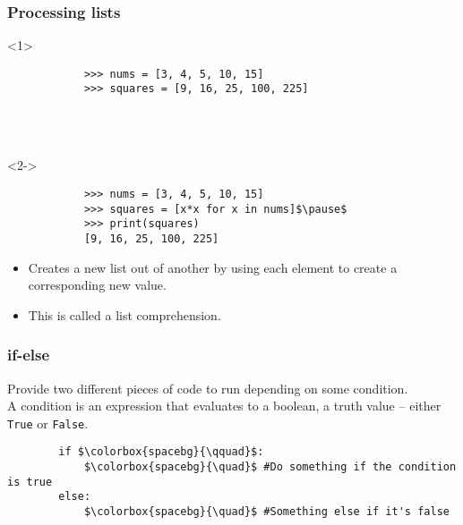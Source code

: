 \documentclass[presentation]{beamer}
\begin{document}
	\begin{frame}[fragile]
		\frametitle{Processing lists}
		
		\begin{onlyenv}<1>
			\begin{lstlisting}
			>>> nums = [3, 4, 5, 10, 15]
			>>> squares = [9, 16, 25, 100, 225]
			\end{lstlisting}
			
			~ \\
			~ \\
			
		\end{onlyenv}
		
		\pause
		
		\begin{onlyenv}<2->
			\begin{lstlisting}
			>>> nums = [3, 4, 5, 10, 15]
			>>> squares = [x*x for x in nums]$\pause$
			>>> print(squares)
			[9, 16, 25, 100, 225]
			\end{lstlisting}
		\end{onlyenv}
		
		\pause
		
		\begin{itemize}
			\item Creates a new list out of another by using each element to create a corresponding new value.
			\item This is called a \colorbox{jargonbg}{list comprehension}.
		\end{itemize}
	\end{frame}
	
	
	\begin{frame}[fragile]
		\frametitle{if-else}
		
		Provide two different pieces of code to run depending on some condition.\\
		\pause
		A condition is an expression that evaluates to a boolean, a truth value -- either \colorbox{codebg}{\lstinline|True|} or \colorbox{codebg}{\lstinline|False|}.
		
		\pause
		\begin{lstlisting}
		if $\colorbox{spacebg}{\qquad}$:
		    $\colorbox{spacebg}{\quad}$ #Do something if the condition is true
		else:
		    $\colorbox{spacebg}{\quad}$ #Something else if it's false
		\end{lstlisting}
	\end{frame}
	
\end{document}
